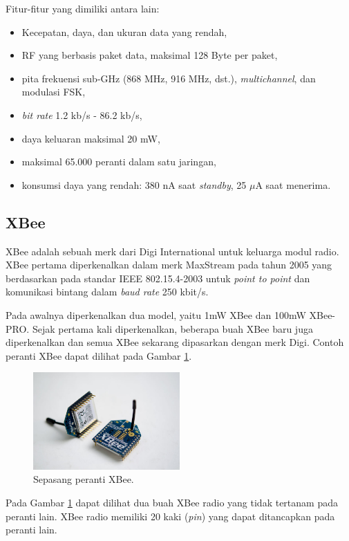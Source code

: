     Fitur-fitur yang dimiliki antara lain:
      \begin{itemize}
        \item Kecepatan, daya, dan ukuran data yang rendah,
        \item RF yang berbasis paket data, maksimal 128 Byte per paket,
        \item pita frekuensi sub-GHz (868 MHz, 916 MHz, dst.), \emph{multichannel}, dan modulasi FSK,
        \item \emph{bit rate} 1.2 kb/s - 86.2 kb/s,
        \item daya keluaran maksimal 20 mW,
        \item maksimal 65.000 peranti dalam satu jaringan,
        \item konsumsi daya yang rendah: 380 nA saat \emph{standby}, 25 $\mu$A saat menerima.
      \end{itemize}


  \subsection{XBee}
    XBee adalah sebuah merk dari Digi International untuk keluarga modul radio. XBee pertama diperkenalkan dalam merk MaxStream pada tahun 2005 yang berdasarkan pada standar IEEE 802.15.4-2003 untuk \emph{point to point} dan komunikasi bintang dalam \emph{baud rate} 250 kbit/s.

    Pada awalnya diperkenalkan dua model, yaitu 1mW XBee dan 100mW XBee-PRO. Sejak pertama kali diperkenalkan, beberapa buah XBee baru juga diperkenalkan dan semua XBee sekarang dipasarkan dengan merk Digi. Contoh peranti XBee dapat dilihat pada Gambar \ref{xbee}.

      \begin{figure}[H]
        \centering
          \includegraphics[width=0.5\textwidth]{gambar/xbee}
          \caption{Sepasang peranti XBee.}
          \label{xbee}
      \end{figure}

    Pada Gambar \ref{xbee} dapat dilihat dua buah XBee radio yang tidak tertanam pada peranti lain. XBee radio memiliki 20 kaki (\emph{pin}) yang dapat ditancapkan pada peranti lain.

